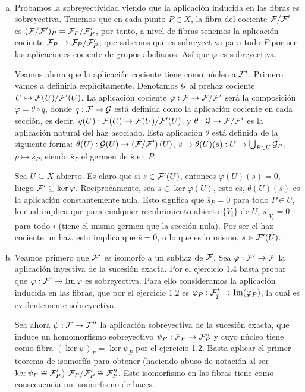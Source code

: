 \documentclass[twoside]{article}
\begin{document}
\begin{solucion}\
\begin{enumerate}[(a)]
\item Probamos la sobreyectividad viendo que la aplicación inducida en las fibras es sobreyectiva. Tenemos que en cada punto $P\in X$, la fibra del cociente $\mathcal{F}/\mathcal{F}'$ es $(\mathcal{F}/\mathcal{F}')_P=\mathcal{F}_P/\mathcal{F}'_P$, por tanto, a nivel de fibras tenemos la aplicación cociente $\mathcal{F}_P\to \mathcal{F}_P/\mathcal{F}'_P$, que sabemos que es sobreyectiva para todo $P$ por ser las aplicaciones cociente de grupos abelianos. Así que $\varphi$ es sobreyectiva.

Veamos ahora que la aplicación cociente tiene como núcleo a $\mathcal{F}'$. Primero vamos a definirla explícitamente. Denotamos $\mathcal{G}$ al prehaz cociente $U\mapsto \mathcal{F}(U)/\mathcal{F}'(U)$. La aplicación cociente $\varphi:\mathcal{F}\to\mathcal{F}/\mathcal{F}'$ será la composición $\varphi=\theta\circ q$, donde $q:\mathcal{F}\to \mathcal{G}$ está definida como la aplicación cociente en cada sección, es decir, $q(U): \mathcal{F}(U)\to \mathcal{F}(U)/\mathcal{F}'(U)$, y $\theta:\mathcal{G}\to\mathcal{F}/\mathcal{F}'$ es la aplicación natural del haz asociado. Esta aplicación $\theta$ está definida de la siguiente forma: $\theta(U):\mathcal{G}(U)\to\left(\mathcal{F}/\mathcal{F}'\right)(U)$, $\overline{s}\mapsto\theta(U)(\overline{s}):U\to\bigcup_{P\in U} \mathcal{G}_P$, $p\mapsto\overline{s}_P$, siendo $\overline{s}_P$ el germen de $\overline{s}$ en $P$.

Sea $U\subseteq X$ abierto. Es claro que si $s\in\mathcal{F}'(U)$, entonces $\varphi(U)(s)=0$, luego $\mathcal{F}'\subseteq\ker\varphi$. Recíprocamente, sea $s\in \ker\varphi(U)$, esto es, $\theta(U)(\overline{s})$ es la aplicación constantemente nula. Esto signfica que $\overline{s}_P=0$ para todo $P\in U$, lo cual implica que para cualquier recubrimiento abierto $\{V_i\}$ de $U$, $\overline{s}|_{V_i}=0$ para todo $i$ (tiene el mismo germen que la sección nula). Por ser el haz cociente un haz, esto implica que $\overline{s}=0$, o lo que es lo mismo, $s\in \mathcal{F}'(U)$. 


\item Veamos primero que $\mathcal{F}'$ es isomorfo a un subhaz de $\mathcal{F}$. Sea $\varphi:\mathcal{F}'\to\mathcal{F}$ la aplicación inyectiva de la sucesión exacta. Por el ejercicio 1.4 basta probar que $\varphi:\mathcal{F}'\to\operatorname{Im}\varphi$ es sobreyectiva. Para ello consideramos la aplicación inducida en las fibras, que por el ejercicio 1.2 es $\varphi_P:\mathcal{F}'_p\to\operatorname{Im}(\varphi_P)$, la cual es evidentemente sobreyectiva. 

Sea ahora $\psi:\mathcal{F}\to\mathcal{F}''$ la aplicación sobreyectiva de la sucesión exacta, que induce un homomorfismo sobreyectivo $\psi_P:\mathcal{F}_P\to\mathcal{F}''_P$ y cuyo núcleo tiene como fibra $(\ker\psi)_P=\ker\psi_P$ por el ejercicio 1.2. Basta aplicar el primer teorema de isomorfía para obtener (haciendo abuso de notación al ser $\ker\psi_P\cong\mathcal{F}'_P$) $\mathcal{F}_P/\mathcal{F}'_P \cong \mathcal{F}''_P$. Este isomorfismo en las fibras tiene como consecuencia un isomorfismo de haces. 
\end{enumerate}
\end{solucion}
\end{document}
